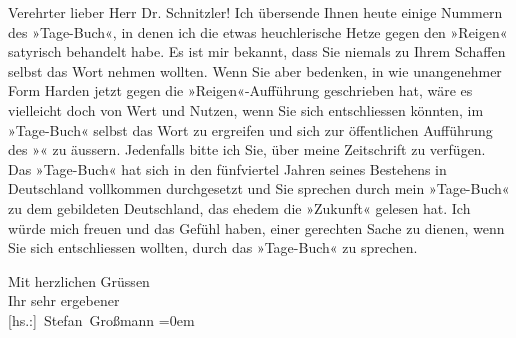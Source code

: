 \pstart{}Verehrter lieber Herr Dr. Schnitzler!\pend\vspace{0.5em}
\pstart
           Ich übersende Ihnen heute einige Nummern des »Tage-Buch«, in denen ich die etwas heuchlerische Hetze gegen den »Reigen« satyrisch behandelt habe. Es ist mir bekannt, dass Sie
               niemals zu Ihrem Schaffen selbst das Wort nehmen wollten. Wenn Sie aber bedenken, in
               wie unangenehmer Form Harden jetzt gegen die
                  »Reigen«-Aufführung geschrieben hat, wäre es vielleicht doch von Wert und Nutzen,
               wenn Sie sich entschliessen könnten, im »Tage-Buch« selbst das Wort zu ergreifen und sich zur öffentlichen Aufführung
               des »\label{T_L02362-1v}\label{T_L02362-1}« zu äussern.
               Jedenfalls bitte ich Sie, über meine Zeitschrift zu verfügen. Das »Tage-Buch« hat sich in den fünfviertel Jahren
               seines Bestehens in Deutschland vollkommen
               durchgesetzt und Sie sprechen durch mein »Tage-Buch« zu dem gebildeten Deutschland, das ehedem die »Zukunft«
               gelesen hat. Ich würde mich freuen und das Gefühl haben, einer gerechten Sache zu
               dienen, wenn Sie sich entschliessen wollten, durch das »Tage-Buch« zu sprechen.\pend
           
\pstart
           Mit herzlichen Grüssen{\\[\baselineskip]} Ihr sehr ergebener{\\[\baselineskip]}\spacefill\mbox{{[}hs.:{]} Stefan Großmann}\pend
           \leftskip=0em{}\endnumbering{}  
      